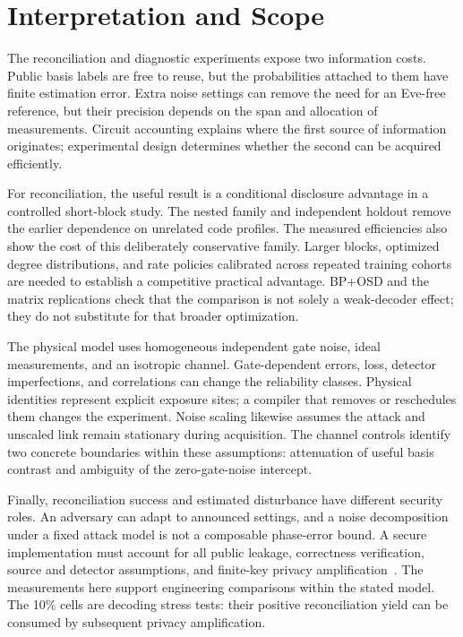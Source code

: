 \section{Interpretation and Scope}
\label{sec:discussion}
The reconciliation and diagnostic experiments expose two information costs. Public basis
labels are free to reuse, but the probabilities attached to them have finite estimation
error. Extra noise settings can remove the need for an Eve-free reference, but their
precision depends on the span and allocation of measurements. Circuit accounting explains
where the first source of information originates; experimental design determines whether
the second can be acquired efficiently.

For reconciliation, the useful result is a conditional disclosure advantage in a controlled
short-block study. The nested family and independent holdout remove the earlier dependence
on unrelated code profiles. The measured efficiencies also show the cost of this deliberately
conservative family. Larger blocks, optimized degree distributions, and rate policies
calibrated across repeated training cohorts are needed to establish a competitive practical
advantage. BP+OSD and the matrix replications check that the comparison is not solely a
weak-decoder effect; they do not substitute for that broader optimization.

The physical model uses homogeneous independent gate noise, ideal measurements, and an
isotropic channel. Gate-dependent errors, loss, detector imperfections, and correlations
can change the reliability classes. Physical identities represent explicit exposure sites;
a compiler that removes or reschedules them changes the experiment. Noise scaling likewise
assumes the attack and unscaled link remain stationary during acquisition. The channel
controls identify two concrete boundaries within these assumptions: attenuation of useful
basis contrast and ambiguity of the zero-gate-noise intercept.

Finally, reconciliation success and estimated disturbance have different security roles.
An adversary can adapt to announced settings, and a noise decomposition under a fixed
attack model is not a composable phase-error bound. A secure implementation must account
for all public leakage, correctness verification, source and detector assumptions, and
finite-key privacy amplification~\cite{shor2000,tomamichel2012,rennerkoenig2005}.
The measurements here support engineering comparisons within the stated model.
The 10\% cells are decoding stress tests: their positive reconciliation yield can be
consumed by subsequent privacy amplification.

